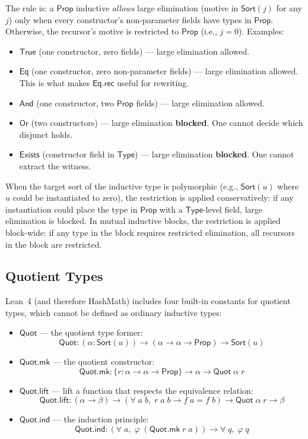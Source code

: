 \documentclass[11pt]{article}
\theoremstyle{definition}
\theoremstyle{plain}
\theoremstyle{remark}
\newcommand{\Sort}{\textsf{Sort}}
\newcommand{\Prop}{\textsf{Prop}}
\newcommand{\Type}{\textsf{Type}}
\newcommand{\Eq}{\textsf{Eq}}
\newcommand{\Quot}{\textsf{Quot}}
\begin{document}
The rule is: a $\Prop$ inductive \emph{allows} large elimination (motive in $\Sort(j)$ for any $j$)
only when every constructor's non-parameter fields have types in $\Prop$.
Otherwise, the recursor's motive is restricted to $\Prop$ (i.e., $j = 0$).
Examples:
\begin{itemize}[nosep]
  \item $\textsf{True}$ (one constructor, zero fields) --- large elimination allowed.
  \item $\Eq$ (one constructor, zero non-parameter fields) --- large elimination allowed.
        This is what makes $\Eq.\textsf{rec}$ useful for rewriting.
  \item $\textsf{And}$ (one constructor, two $\Prop$ fields) --- large elimination allowed.
  \item $\textsf{Or}$ (two constructors) --- large elimination \textbf{blocked}.
        One cannot decide which disjunct holds.
  \item $\textsf{Exists}$ (constructor field in $\Type$) --- large elimination \textbf{blocked}.
        One cannot extract the witness.
\end{itemize}
When the target sort of the inductive type is polymorphic (e.g., $\Sort(u)$ where $u$
could be instantiated to zero), the restriction is applied conservatively: if any
instantiation could place the type in $\Prop$ with a $\Type$-level field,
large elimination is blocked.
In mutual inductive blocks, the restriction is applied block-wide: if any type
in the block requires restricted elimination, all recursors in the block are restricted.

\subsection{Quotient Types}
\label{sec:quotient}

Lean~4 (and therefore HashMath) includes four built-in constants for quotient types, which
cannot be defined as ordinary inductive types:

\begin{itemize}[nosep]
  \item $\Quot$ --- the quotient type former:
    \[ \Quot : (\alpha : \Sort(u)) \to (\alpha \to \alpha \to \Prop) \to \Sort(u) \]

  \item $\Quot.\textsf{mk}$ --- the quotient constructor:
    \[ \Quot.\textsf{mk} : \{r : \alpha \to \alpha \to \Prop\} \to \alpha \to \Quot\;\alpha\;r \]

  \item $\Quot.\textsf{lift}$ --- lift a function that respects the equivalence relation:
    \[ \Quot.\textsf{lift} : (\alpha \to \beta) \to (\forall\;a\;b,\; r\;a\;b \to f\;a = f\;b) \to \Quot\;\alpha\;r \to \beta \]

  \item $\Quot.\textsf{ind}$ --- the induction principle:
    \[ \Quot.\textsf{ind} : (\forall\;a,\; \varphi\;(\Quot.\textsf{mk}\;r\;a)) \to \forall\;q,\; \varphi\;q \]
\end{itemize}
\end{document}
